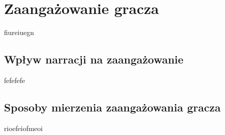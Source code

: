 \chapter{Zaangażowanie gracza}\label{chapter:ch3}

fiureiuegn

\section{Wpływ narracji na zaangażowanie}\label{section:ch3_1}

fefefefe

\section{Sposoby mierzenia zaangażowania gracza}\label{section:ch3_2}

rioefeiofmeoi